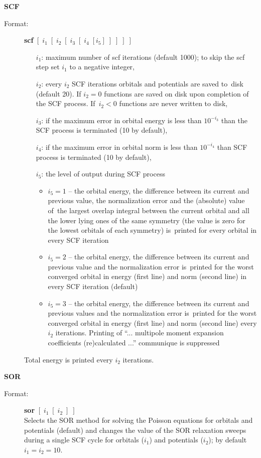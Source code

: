 \documentclass[12pt,a4paper]{article}
\begin{document}
\begin{description}
\item \textbf{SCF}
\begin{description} 
\item[Format:] \textbf{scf}
$[\;i_1\;[\;i_2\;[\;i_3\;[\;i_4\;[i_5]\;]\;]\;]\;]$ 
\begin{itemize} 
\item[$i_1$:] maximum number of scf iterations (default 1000); to skip the scf step set
  $i_1$ to a negative integer,
\item[$i_2$:] every $i_2$ SCF iterations orbitals and potentials are saved to~disk
  (default 20).
  If $i_2=0$ functions are saved on disk upon completion of the SCF
  process. If~$i_2<0$ functions are never written to disk,
\item[$i_3$:] if the maximum error in orbital energy is less than $10^{-i_3}$ than the SCF
  process is terminated (10 by default),
\item[$i_4$:] if the maximum error in orbital norm is less than $10^{-i_4}$ than SCF
  process is terminated (10 by default),
\item[$i_5$:] the level of output during SCF process
\begin{itemize} 
\item $i_5=1$ -- the orbital energy, the difference between its current and previous
  value, the normalization error and the (absolute) value of~the largest overlap integral
  between the current orbital and all the lower lying ones of the same symmetry (the value
  is zero for the lowest orbitals of each symmetry) is~printed for every orbital in every
  SCF iteration
\item $i_5=2$ -- the orbital energy, the difference between its current and previous value
  and the normalization error is~printed for the worst converged orbital in energy (first
  line) and norm (second line) in every SCF iteration (default)
\item $i_5=3$ -- the orbital energy, the difference between its current and previous values
  and the normalization error is~printed for the worst converged orbital in energy (first
  line) and norm (second line) every $i_2$ iterations. Printing of ``... multipole moment
  expansion coefficients (re)calculated ...''  communique is suppressed
\end{itemize} 
\end{itemize} 
Total energy is printed every $i_2$ iterations.
\end{description} 


\item \textbf{SOR} 
\begin{description} 
\item[Format:] \textbf{sor} $[\;i_1\;[\;i_2\;]\;]$\\
Selects the SOR method for solving the Poisson equations for orbitals and potentials
(default) and changes the value of the SOR relaxation sweeps during a single SCF
cycle for orbitals ($i_1$) and potentials ($i_2$); by default $i_1=i_2=10$.


\end{description}
\end{description}
\end{document}
